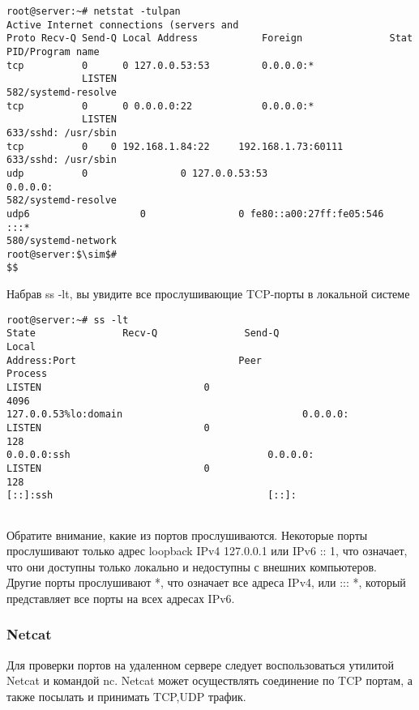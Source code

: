 \documentclass[14pt, a4paper]{article}
\begin{document}
\begin{lstlisting}
root@server:~# netstat -tulpan
Active Internet connections (servers and
Proto Recv-Q Send-Q Local Address           Foreign               Stat
PID/Program name
tcp          0      0 127.0.0.53:53         0.0.0.0:*
             LISTEN
582/systemd-resolve
tcp          0      0 0.0.0.0:22            0.0.0.0:*
             LISTEN
633/sshd: /usr/sbin
tcp          0    0 192.168.1.84:22     192.168.1.73:60111
633/sshd: /usr/sbin
udp          0                0 127.0.0.53:53                  0.0.0.0:
582/systemd-resolve
udp6                   0                0 fe80::a00:27ff:fe05:546   :::*
580/systemd-network
root@server:$\sim$#
$$
\end{lstlisting}
\vspace{0.2cm}

Набрав \colorbox{backcolour}{ss -lt}, вы увидите все прослушивающие TCP-порты в локальной системе

\vspace{0.3cm}
\begin{lstlisting}
root@server:~# ss -lt
State               Recv-Q               Send-Q                     Local
Address:Port                            Peer                    Process
LISTEN                            0                                  4096
127.0.0.53%lo:domain                               0.0.0.0:
LISTEN                            0                                   128
0.0.0.0:ssh                                  0.0.0.0:
LISTEN                            0                                   128
[::]:ssh                                     [::]:


\end{lstlisting}
\vspace{0.2cm}

Обратите внимание, какие из портов прослушиваются. Некоторые порты прослушивают только адрес
loopback IPv4 127.0.0.1 или IPv6 :: 1, что означает, что они доступны только локально и недоступны с
внешних компьютеров. Другие порты прослушивают *, что означает все адреса IPv4, или ::: *, который
представляет все порты на всех адресах IPv6.

\subsubsection*{Netcat} 

Для проверки портов на удаленном сервере следует воспользоваться утилитой Netcat и командой nc.
Netcat может осуществлять соединение по TCP портам, а также посылать и принимать TCP,UDP
трафик.\\
\end{document}
